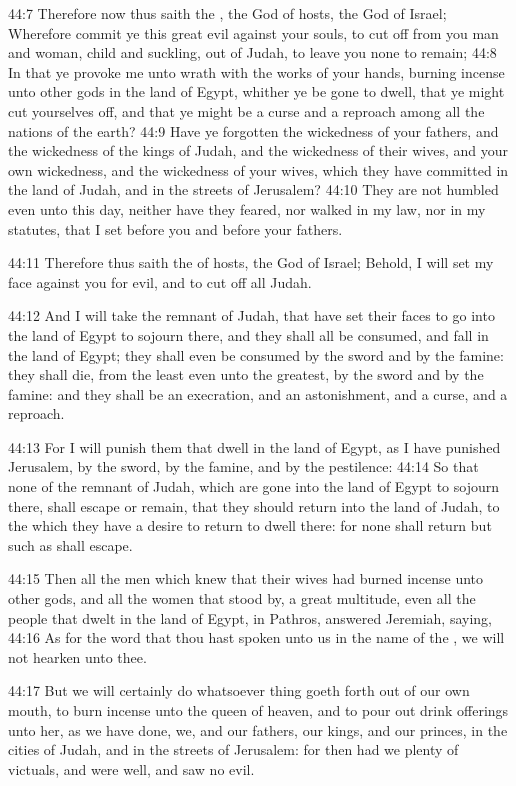 44:7 Therefore now thus saith the \LORD, the God of hosts, the God of Israel; Wherefore commit ye this great evil against your souls, to cut off from you man and woman, child and suckling, out of Judah, to leave you none to remain; 44:8 In that ye provoke me unto wrath with the works of your hands, burning incense unto other gods in the land of Egypt, whither ye be gone to dwell, that ye might cut yourselves off, and that ye might be a curse and a reproach among all the nations of the earth?  44:9 Have ye forgotten the wickedness of your fathers, and the wickedness of the kings of Judah, and the wickedness of their wives, and your own wickedness, and the wickedness of your wives, which they have committed in the land of Judah, and in the streets of Jerusalem?  44:10 They are not humbled even unto this day, neither have they feared, nor walked in my law, nor in my statutes, that I set before you and before your fathers.

44:11 Therefore thus saith the \LORD of hosts, the God of Israel; Behold, I will set my face against you for evil, and to cut off all Judah.

44:12 And I will take the remnant of Judah, that have set their faces to go into the land of Egypt to sojourn there, and they shall all be consumed, and fall in the land of Egypt; they shall even be consumed by the sword and by the famine: they shall die, from the least even unto the greatest, by the sword and by the famine: and they shall be an execration, and an astonishment, and a curse, and a reproach.

44:13 For I will punish them that dwell in the land of Egypt, as I have punished Jerusalem, by the sword, by the famine, and by the pestilence: 44:14 So that none of the remnant of Judah, which are gone into the land of Egypt to sojourn there, shall escape or remain, that they should return into the land of Judah, to the which they have a desire to return to dwell there: for none shall return but such as shall escape.

44:15 Then all the men which knew that their wives had burned incense unto other gods, and all the women that stood by, a great multitude, even all the people that dwelt in the land of Egypt, in Pathros, answered Jeremiah, saying, 44:16 As for the word that thou hast spoken unto us in the name of the \LORD, we will not hearken unto thee.

44:17 But we will certainly do whatsoever thing goeth forth out of our own mouth, to burn incense unto the queen of heaven, and to pour out drink offerings unto her, as we have done, we, and our fathers, our kings, and our princes, in the cities of Judah, and in the streets of Jerusalem: for then had we plenty of victuals, and were well, and saw no evil.

